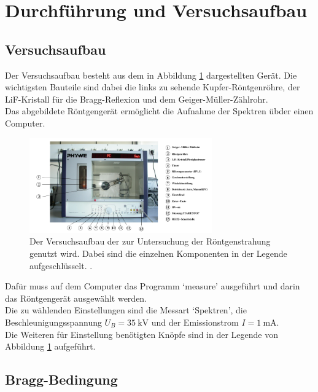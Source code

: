 \newpage
\section{Durchführung und Versuchsaufbau}

\subsection{Versuchsaufbau}

\noindent Der Versuchsaufbau besteht aus dem in Abbildung \ref{img:aufbau} dargestellten Gerät. 
Die wichtigsten Bauteile sind dabei die links zu sehende Kupfer-Röntgenröhre, der LiF-Kristall für die Bragg-Reflexion und dem Geiger-Müller-Zählrohr.\\
Das abgebildete Röntgengerät ermöglicht die Aufnahme der Spektren übder einen Computer.
\begin{figure}[ht]
    \centering
    \includegraphics[width=0.7\textwidth]{latex/images/aufbau.PNG}
    \caption{Der Versuchsaufbau der zur Untersuchung der Röntgenstrahung genutzt wird. Dabei sind die einzelnen Komponenten in der Legende aufgeschlüsselt. \protect \cite{V401}.}
    \label{img:aufbau}
\end{figure}

\noindent Dafür muss auf dem Computer das Programm \enquote*{measure} ausgeführt und darin das Röntgengerät ausgewählt werden.\\
Die zu wählenden Einstellungen sind die Messart \enquote*{Spektren}, die Beschleunigungsspannung $U_B=\SI{35}{\kilo\volt}$ und der Emissionstrom $I=\SI{1}{\milli\ampere}$.\\
Die Weiteren für Einstellung benötigten Knöpfe sind in der Legende von Abbildung \ref{img:aufbau} aufgeführt.


\subsection{Bragg-Bedingung}

